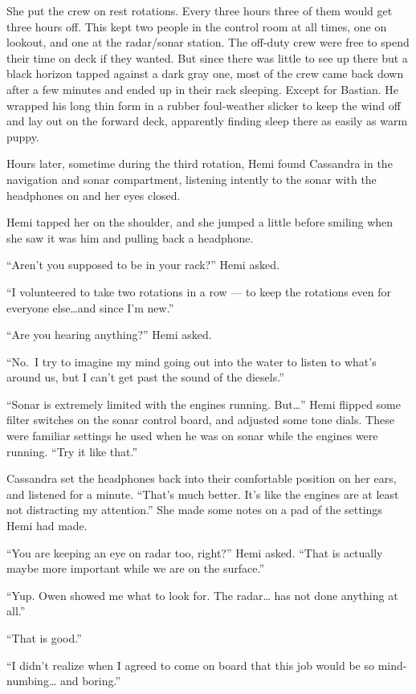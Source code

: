 \documentclass[]{scrbook}
\begin{document}
She put the crew on rest rotations. Every three hours three of them
would get three hours off. This kept two people in the control room at
all times, one on lookout, and one at the radar/sonar station. The
off-duty crew were free to spend their time on deck if they wanted. But
since there was little to see up there but a black horizon tapped
against a dark gray one, most of the crew came back down after a few
minutes and ended up in their rack sleeping. Except for Bastian. He
wrapped his long thin form in a rubber foul-weather slicker to keep the
wind off and lay out on the forward deck, apparently finding sleep there
as easily as warm puppy.

Hours later, sometime during the third rotation, Hemi found Cassandra in
the navigation and sonar compartment, listening intently to the sonar
with the headphones on and her eyes closed.

Hemi tapped her on the shoulder, and she jumped a little before smiling
when she saw it was him and pulling back a headphone.

``Aren't you supposed to be in your rack?'' Hemi asked.

``I volunteered to take two rotations in a row --- to keep the rotations
even for everyone else\ldots{}and since I'm new.''

``Are you hearing anything?'' Hemi asked.

``No.~I try to imagine my mind going out into the water to listen to
what's around us, but I can't get past the sound of the diesels.''

``Sonar is extremely limited with the engines running. But\ldots{}''
Hemi flipped some filter switches on the sonar control board, and
adjusted some tone dials. These were familiar settings he used when he
was on sonar while the engines were running. ``Try it like that.''

Cassandra set the headphones back into their comfortable position on her
ears, and listened for a minute. ``That's much better. It's like the
engines are at least not distracting my attention.'' She made some notes
on a pad of the settings Hemi had made.

``You are keeping an eye on radar too, right?'' Hemi asked. ``That is
actually maybe more important while we are on the surface.''

``Yup. Owen showed me what to look for. The radar\ldots{} has not done
anything at all.''

``That is good.''

``I didn't realize when I agreed to come on board that this job would be
so mind-numbing\ldots{} and boring.''
\end{document}
